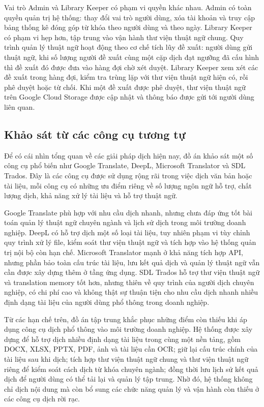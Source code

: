 \documentclass[../DoAn.tex]{subfiles}
\begin{document}
Vai trò Admin và Library Keeper có phạm vi quyền khác nhau. Admin có toàn quyền quản trị hệ thống: thay đổi vai trò người dùng, xóa tài khoản và truy cập bảng thống kê đóng góp từ khóa theo người dùng và theo ngày. Library Keeper có phạm vi hẹp hơn, tập trung vào vận hành thư viện thuật ngữ chung. Quy trình quản lý thuật ngữ hoạt động theo cơ chế tích lũy đề xuất: người dùng gửi thuật ngữ, khi số lượng người đề xuất cùng một cặp dịch đạt ngưỡng đã cấu hình thì đề xuất đó được đưa vào hàng đợi chờ xét duyệt. Library Keeper xem xét các đề xuất trong hàng đợi, kiểm tra trùng lặp với thư viện thuật ngữ hiện có, rồi phê duyệt hoặc từ chối. Khi một đề xuất được phê duyệt, thư viện thuật ngữ trên Google Cloud Storage được cập nhật và thông báo được gửi tới người dùng liên quan.

\subsection{Khảo sát từ các công cụ tương tự}
\label{subsection:2.1.2}

Để có cái nhìn tổng quan về các giải pháp dịch hiện nay, đồ án khảo sát một số công cụ phổ biến như Google Translate, DeepL, Microsoft Translator và SDL Trados. Đây là các công cụ được sử dụng rộng rãi trong việc dịch văn bản hoặc tài liệu, mỗi công cụ có những ưu điểm riêng về số lượng ngôn ngữ hỗ trợ, chất lượng dịch, khả năng xử lý tài liệu và hỗ trợ thuật ngữ.

Google Translate phù hợp với nhu cầu dịch nhanh, nhưng chưa đáp ứng tốt bài toán quản lý thuật ngữ chuyên ngành và lịch sử dịch trong môi trường doanh nghiệp. DeepL có hỗ trợ dịch một số loại tài liệu, tuy nhiên phạm vi tùy chỉnh quy trình xử lý file, kiểm soát thư viện thuật ngữ và tích hợp vào hệ thống quản trị nội bộ còn hạn chế. Microsoft Translator mạnh ở khả năng tích hợp API, nhưng phần bảo toàn cấu trúc tài liệu, lưu kết quả dịch và quản lý thuật ngữ vẫn cần được xây dựng thêm ở tầng ứng dụng. SDL Trados hỗ trợ thư viện thuật ngữ và translation memory tốt hơn, nhưng thiên về quy trình của người dịch chuyên nghiệp, có chi phí cao và không thật sự thuận tiện cho nhu cầu dịch nhanh nhiều định dạng tài liệu của người dùng phổ thông trong doanh nghiệp.

Từ các hạn chế trên, đồ án tập trung khắc phục những điểm còn thiếu khi áp dụng công cụ dịch phổ thông vào môi trường doanh nghiệp. Hệ thống được xây dựng để hỗ trợ dịch nhiều định dạng tài liệu trong cùng một nền tảng, gồm DOCX, XLSX, PPTX, PDF, ảnh và tài liệu cần OCR; giữ lại cấu trúc chính của tài liệu sau khi dịch; tích hợp thư viện thuật ngữ chung và thư viện thuật ngữ riêng để kiểm soát cách dịch từ khóa chuyên ngành; đồng thời lưu lịch sử kết quả dịch để người dùng có thể tải lại và quản lý tập trung. Nhờ đó, hệ thống không chỉ dịch nội dung mà còn bổ sung các chức năng quản lý và vận hành còn thiếu ở các công cụ dịch rời rạc.
\end{document}
